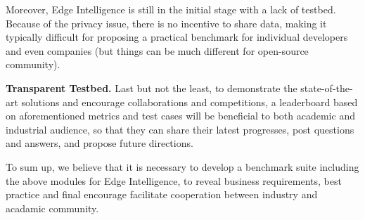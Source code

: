Moreover, Edge Intelligence is still in the initial stage with a lack of testbed. Because of the privacy issue, there is no incentive to share data, making it typically difficult for proposing a practical benchmark for individual developers and even companies (but things can be much different for open-source community).  

\textbf{Transparent Testbed.} Last but not the least, to demonstrate the state-of-the-art solutions and encourage collaborations and competitions, a leaderboard based on aforementioned metrics and test cases will be beneficial to both academic and industrial audience, so that they can share their latest progresses, post questions and answers,  and propose future directions.

To sum up, we believe that it is necessary to develop a benchmark suite including the above modules for Edge Intelligence, to reveal business requirements, best practice and final encourage facilitate cooperation between industry and acadamic community.
